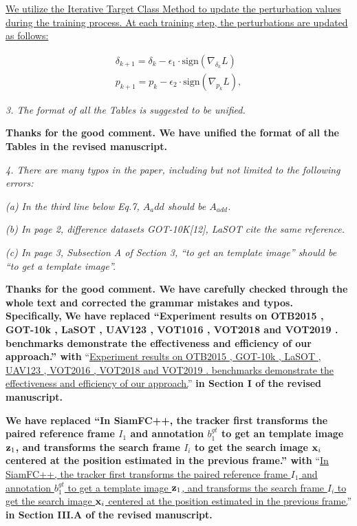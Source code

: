 \documentclass[12pt]{article}
\begin{document}
\uline{We utilize the Iterative Target Class Method to update the perturbation values during the training process. At each training step, the perturbations are updated as follows:}

\begin{gather}
  \delta_{k+1} = \delta_{k} - \epsilon_1 \cdot \text{sign}(\nabla_{\delta_k}L)\\
  p_{k+1} = p_{k} - \epsilon_2 \cdot \text{sign}(\nabla_{p_k}L),
\end{gather}


\textit{3. The format of all the Tables is suggested to be unified.}

\textbf{Thanks for the good comment. We have unified the format of all the Tables in the revised manuscript.}

\textit{4. There are many typos in the paper, including but not limited to the following errors:}

\textit{(a) In the third line below Eq.7, $A_{a}dd$ should be $A_{add}$.}

\textit{(b) In page 2, difference datasets GOT-10K[12], LaSOT \cite{LaSOT} cite the same reference.}

\textit{(c) In page 3, Subsection A of Section 3, “to get an template image” should be “to get a template image”.}

\textbf{Thanks for the good comment. We have carefully checked through the whole text and corrected the grammar mistakes and typos. Specifically,}
\textbf{We have replaced ``Experiment results on OTB2015 \cite{OTB}, GOT-10k \cite{GOT-10k}, LaSOT \cite{GOT-10k}, UAV123 \cite{UAV123}, VOT1016 \cite{VOT2016}, VOT2018 \cite{VOT2018} and VOT2019 \cite{VOT2019}. benchmarks demonstrate the effectiveness and efficiency of our approach.'' with}
``\uline{Experiment results on OTB2015 \cite{OTB}, GOT-10k \cite{GOT-10k}, LaSOT \cite{LaSOT}, UAV123 \cite{UAV123}, VOT2016 \cite{VOT2016}, VOT2018 \cite{VOT2018} and VOT2019 \cite{VOT2019}. benchmarks demonstrate the effectiveness and efficiency of our approach.}''
\textbf{in Section I of the revised manuscript.}

\textbf{We have replaced ``In SiamFC++, the tracker first transforms the paired reference frame $I_1$ and annotation $b_1^{gt}$ to get an template image $\textbf z_1$, and transforms the search frame $I_i$ to get the search image $\textbf x_i$ centered at the position estimated in the previous frame.'' with}
``\uline{In SiamFC++, the tracker first transforms the paired reference frame $I_1$ and annotation $b_1^{gt}$ to get a template image $\textbf z_1$, and transforms the search frame $I_i$ to get the search image $\textbf x_i$ centered at the position estimated in the previous frame.}''
\textbf{in Section III.A of the revised manuscript.}
\end{document}
